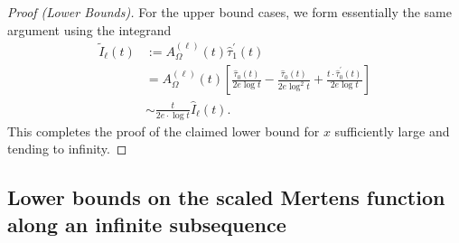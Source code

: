 \documentclass[11pt,reqno,a4letter]{article}
\numberwithin{figure}{section}
\numberwithin{table}{section}
\theoremstyle{plain}
\numberwithin{theorem}{section}
\theoremstyle{definition}
\begin{document}
\begin{proof}[Proof (Lower Bounds)]
For the upper bound cases, we form essentially the same argument using the integrand 
\begin{align*} 
\widetilde{I}_{\ell}(t) & := A_{\Omega}^{(\ell)}(t) \widehat{\tau}_1^{\prime}(t) \\ 
     & = A_{\Omega}^{(\ell)}(t) \left[\frac{\widehat{\tau}_0(t)}{2e \log t} - 
     \frac{\widehat{\tau}_0(t)}{2e \log^2 t} + 
     \frac{t \cdot \widehat{\tau}_0^{\prime}(t)}{2e \log t}\right] \\ 
     & \sim \frac{t}{2e \cdot \log t} \widehat{I}_{\ell}(t). 
\end{align*} 
This completes the proof of the claimed lower bound for $x$ sufficiently large and tending to infinity. 
\end{proof} 

\subsection{Lower bounds on the scaled Mertens function along an infinite subsequence}
\end{document}
